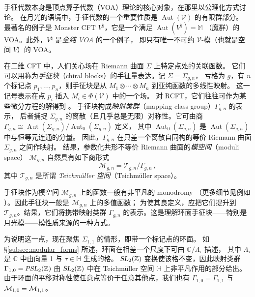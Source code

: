 \documentclass[11pt,a4paper,fontset=windows]{ctexart}
\numberwithin{equation}{section}
\newcommand{\PSL}{\operatorname{\textsl{PSL}}}    %
\newcommand{\SL}{\operatorname{\textsl{SL}}}      %
\newcommand{\Aut}{\operatorname{\text{Aut}}}      %
\newcommand{\CC}{\mathbb{C}}
\newcommand{\HH}{\mathbb{H}}
\newcommand{\MM}{\mathbb{M}}
\newcommand{\Z}{\mathbb{Z}}
\def\t{\tau}
\begin{document}

手征代数本身是顶点算子代数（VOA）理论的核心对象，在那里以公理化方式讨论。
在月光的语境中，手征代数的一个重要性质是 $\Aut(\mathcal{V})$ 的有限群部分。
最著名的例子是 Monster CFT $V^\natural$，它是一个满足 $\Aut(V^\natural)=\MM$
（魔群）的 VOA。此外，$V^\natural$ 是\emph{全纯 VOA} 的一个例子，
即只有唯一不可约 $\mathcal{V}$-模（也就是空间 $V$）的 VOA。

在二维 CFT 中，人们关心场在 Riemann 曲面 $\Sigma$ 上特定点处的关联函数。
它们可以用称为\emph{手征块}（chiral blocks）的手征量表达。记 $\Sigma=\Sigma_{g,n}$，
亏格为 $g$，有 $n$ 个标记点 $p_1,\dots,p_n$，则手征块是从
$M_1 \otimes\cdots\otimes M_n$ 到亚纯函数的多线性映射。
这一记号表示在点 $p_i$ 插入 $M_i\in\Phi(\mathcal{V})$ 中的一个场。
对 RCFT，它们往往可作为某些微分方程的解得到
\cite{FelderGiovanni1996TKeo,FuchsJürgen1992ALaa,KohnoToshitake2002Cfta}。
手征块构成\emph{映射类群}（mapping class group）$\Gamma_{g,n}$ 的表示，
后者捕捉 $\Sigma_{g,n}$ 的离散（且几乎总是无限）对称性。它可由商
$\Gamma_{g,n}\cong\Aut(\Sigma_{g,n})/\Aut_0(\Sigma_{g,n})$ 定义，
其中 $\Aut_0(\Sigma_{g,n})$ 是 $\Aut(\Sigma_{g,n})$ 中与恒等元连通的分量。
因此，$\Gamma_{g,n}$ 在只差一个离散自同构的等价 Riemann 曲面 $\Sigma_{g,n}$ 之间作映射。
结果，参数化共形不等价 Riemann 曲面的\emph{模空间}（moduli space）
$\mathcal{M}_{g,n}$ 自然具有如下商形式
\begin{equation}
\label{eq:moduli_space}
\mathcal{M}_{g,n}=\mathcal{T}_{g,n}/\Gamma_{g,n}~,
\end{equation} 其中 $\mathcal{T}_{g,n}$ 是所谓 \emph{Teichm\"uller 空间}（Teichmüller space）。

手征块作为模空间 $\mathcal{M}_{g,n}$ 上的函数一般有非平凡的 monodromy
（更多细节见例如 \cite{MR2201600}）。因此手征块一般是 $\mathcal{M}_{g,n}$ 上的多值函数；
为使其良定义，应把它们提升到 $\mathcal{T}_{g,n}$。结果，它们将携带映射类群
$\Gamma_{g,n}$ 的表示。这是理解环面手征块——特别是月光模——模性质来源的一种方式。

为说明这一点，现在聚焦 $\Sigma_{1,1}$ 的情形，即带一个标记点的环面。
如 \S\ref{subsec:modular_forms} 所述，环面在相差一个尺度下可由 $\CC/\Lambda_\t$ 描述，
其中 $\Lambda_\t$ 是 $\CC$ 中由向量 1 与 $\t\in \HH$ 生成的格。
$\SL_2(\Z)$ 变换使该格不变，因此映射类群 $\Gamma_{1,0} = \PSL_2(\Z)$
由 $\SL_2(\Z)$ 中在 Teichm\"uller 空间 $\HH$ 上非平凡作用的部分给出。
由于环面的平移对称性使任意点等价于任意其他点，我们也有
$\Gamma_{1,0}=\Gamma_{1,1}$ 与 ${\cal M}_{1,0} = {\cal M}_{1,1}$。
\end{document}
